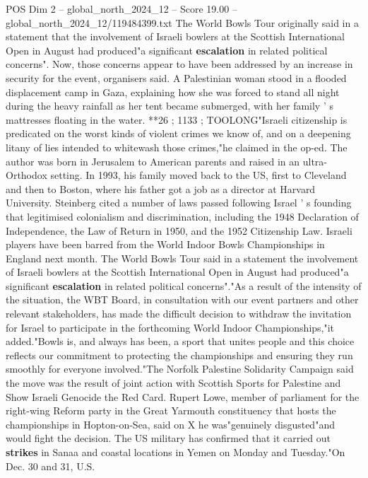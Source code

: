 \begin{textsample}{POS Dim 2 – global\_north\_2024\_12 – Score 19.00 – global\_north\_2024\_12/119484399.txt}  \label{ex:f2_pos_279}
The World Bowls Tour originally said in a statement that the involvement of Israeli bowlers at the Scottish International Open in August had produced"a significant \textbf{escalation} in related political concerns".
Now, those concerns appear to have been addressed by an increase in security for the event, organisers said.
A Palestinian woman stood in a flooded displacement camp in Gaza, explaining how she was forced to stand all night during the heavy rainfall as her tent became submerged, with her family ' s mattresses floating in the water. **26 ; 1133 ; TOOLONG"Israeli citizenship is predicated on the worst kinds of violent crimes we know of, and on a deepening litany of lies intended to whitewash those crimes,"he claimed in the op-ed.
The author was born in Jerusalem to American parents and raised in an ultra-Orthodox setting.
In 1993, his family moved back to the US, first to Cleveland and then to Boston, where his father got a job as a director at Harvard University.
Steinberg cited a number of laws passed following Israel ' s founding that legitimised colonialism and discrimination, including the 1948 Declaration of Independence, the Law of Return in 1950, and the 1952 Citizenship Law.
Israeli players have been barred from the World Indoor Bowls Championships in England next month.
The World Bowls Tour said in a statement the involvement of Israeli bowlers at the Scottish International Open in August had produced"a significant \textbf{escalation} in related political concerns"."As a result of the intensity of the situation, the WBT Board, in consultation with our event partners and other relevant stakeholders, has made the difficult decision to withdraw the invitation for Israel to participate in the forthcoming World Indoor Championships,"it added."Bowls is, and always has been, a sport that unites people and this choice reflects our commitment to protecting the championships and ensuring they run smoothly for everyone involved."The Norfolk Palestine Solidarity Campaign said the move was the result of joint action with Scottish Sports for Palestine and Show Israeli Genocide the Red Card.
Rupert Lowe, member of parliament for the right-wing Reform party in the Great Yarmouth constituency that hosts the championships in Hopton-on-Sea, said on X he was"genuinely disgusted"and would fight the decision.
The US military has confirmed that it carried out \textbf{strikes} in Sanaa and coastal locations in Yemen on Monday and Tuesday."On Dec. 30 and 31, U.S.

\end{textsample}
